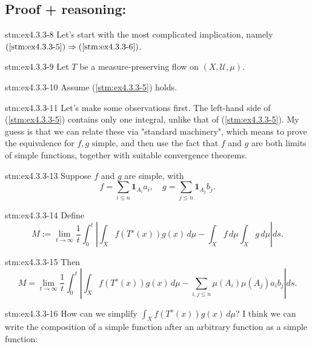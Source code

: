 \subsection*{Proof {\color{blue}+ reasoning}:}

\begin{explanation}{stm:ex4.3.3-8}
Let's start with the most complicated implication, namely $(\ref{stm:ex4.3.3-5}) \Rightarrow (\ref{stm:ex4.3.3-6})$.
\end{explanation}

\begin{statement}{stm:ex4.3.3-9}
Let $T$ be a measure-preserving flow on $(X, \mathcal{U}, \mu)$.
\end{statement}

\begin{statement}{stm:ex4.3.3-10}
Assume (\ref{stm:ex4.3.3-5}) holds.
\end{statement}

\begin{explanation}{stm:ex4.3.3-11}
Let's make some observations first. The left-hand side of (\ref{stm:ex4.3.3-5}) contains only one integral, unlike that of (\ref{stm:ex4.3.3-5}). My guess is that we can relate these via "standard machinery", which means to prove the equivalence for $f, g$ simple, and then use the fact that $f$ and $g$ are both limits of simple functions, together with suitable convergence theorems.
\end{explanation}

\begin{statement}{stm:ex4.3.3-13}
Suppose $f$ and $g$ are simple, with 
\[
f = \sum_{i \leq n} \mathbf{1}_{A_i} a_i, \quad g = \sum_{j \leq n} \mathbf{1}_{A_j} b_j.
\]
\end{statement}

\begin{statement}{stm:ex4.3.3-14}
Define
\[
M:= \lim_{t \to \infty} \frac{1}{t} \int_0^t \left| \int_X f(T^s(x))g(x) \, d\mu - \int_X f \, d\mu \int_X g \, d\mu \right| ds.
\]
\end{statement}

\begin{statement}{stm:ex4.3.3-15}
Then
\[
M= \lim_{t \to \infty} \frac{1}{t} \int_0^t \left| \int_X f(T^s(x))g(x) \, d\mu - \sum_{i,j \leq n} \mu(A_i) \mu(A_j) a_i b_j \right| ds.
\]
\end{statement}

\begin{explanation}{stm:ex4.3.3-16}
How can we simplify $\int_X f(T^s(x)) g(x) \, d\mu$? I think we can write the composition of a simple function after an arbitrary function as a simple function:
\end{explanation}

